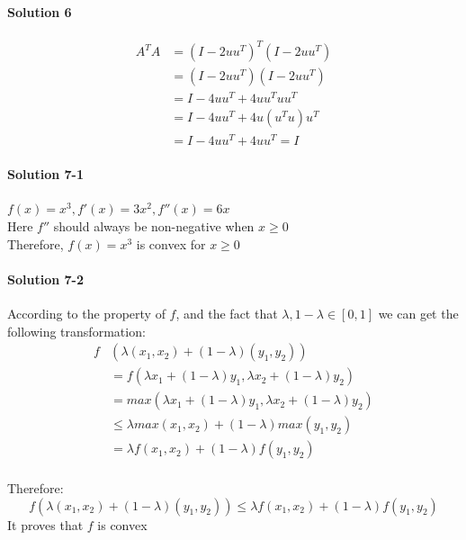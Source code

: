 \documentclass[paper=a4, fontsize=11pt]{scrartcl} %
\numberwithin{equation}{section} %
\numberwithin{figure}{section} %
\numberwithin{table}{section} %
\begin{document}
\paragraph{\textbf{Solution 6}}
\begin{align*}
A^{T}A &=\left ( I-2uu^{T} \right )^{T}\left ( I-2uu^{T} \right )
\\ &=\left ( I-2uu^{T} \right )\left ( I-2uu^{T} \right )
\\ &=I-4uu^{T}+4uu^{T}u u^{T}
\\ &=I-4uu^{T}+4u\left (u^{T}u  \right )u^{T}
\\ &=I-4uu^{T}+4uu^{T}=I
\end{align*}

\paragraph{\textbf{Solution 7-1}}
$f\left ( x \right )=x^{3}, {f}'\left ( x \right )=3x^{2},{f}''\left ( x \right )=6x$
\\ Here ${f}''$ should always be non-negative when $x\geqslant 0$
\\ Therefore, $f\left ( x \right )=x^{3}$ is convex for $x\geqslant 0$

\paragraph{\textbf{Solution 7-2}}
According to the property of $f$, and the fact that $\lambda ,1-\lambda \in \left [ 0,1 \right ]$ we can get the following transformation:
\begin{align*}
f&\left ( \lambda \left (x_{1},x_{2}  \right )+\left ( 1-\lambda  \right )\left (y_{1},y_{2}  \right ) \right )
\\ &=f\left ( \lambda x_{1}+\left ( 1-\lambda  \right )y_{1},\lambda x_{2}+\left ( 1-\lambda  \right )y_{2} \right )
\\ &=max\left ( \lambda x_{1}+\left ( 1-\lambda  \right )y_{1},\lambda x_{2}+\left ( 1-\lambda  \right )y_{2} \right )
\\ &\leqslant \lambda max\left (  x_{1},x_{2}\right )+\left ( 1-\lambda  \right )max\left (y_{1},y_{2}  \right )
\\ &=\lambda f\left ( x_{1},x_{2} \right )+\left ( 1-\lambda  \right )f\left ( y_{1},y_{2} \right )
\end{align*}
\\ Therefore:
\begin{equation*}
f\left ( \lambda \left (x_{1},x_{2}  \right )+\left ( 1-\lambda  \right )\left (y_{1},y_{2}  \right ) \right )\leqslant \lambda f\left ( x_{1},x_{2} \right )+\left ( 1-\lambda  \right )f\left ( y_{1},y_{2} \right )
\end{equation*}
It proves that $f$ is convex
\end{document}
